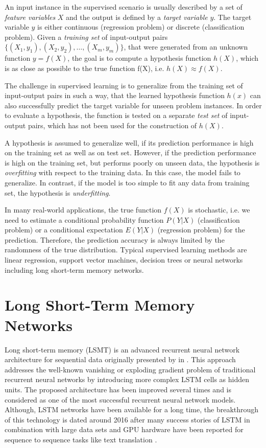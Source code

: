 An input instance in the supervised scenario is usually described by a set of \textit{feature variables} $X$ and the output is defined by a \textit{target variable} $y$.
The target variable $y$ is either continuous (regression problem) or discrete (classification problem).
Given a \textit{training set} of input-output pairs $\{(X_1, y_1), (X_2, y_2), \dots, (X_m,y_m)\}$, that were generated from an unknown function $y = f(X)$, the goal is to compute a hypothesis function $h(X)$, which is as close as possible to the true function f(X), i.e. $h(X) \approx f(X)$.

The challenge in supervised learning is to generalize from the training set of input-output pairs in such a way, that the learned hypothesis function $h(x)$ can also successfully predict the target variable for unseen problem instances.
In order to evaluate a hypothesis, the function is tested on a separate \textit{test set} of input-output pairs, which has not been used for the construction of $h(X)$.

A hypothesis is assumed to generalize well, if its prediction performance is high on the training set as well as on test set.
However, if the prediction performance is high on the training set, but performs poorly on unseen data, the hypothesis is \textit{overfitting} with respect to the training data.
In this case, the model fails to generalize.
In contrast, if the model is too simple to fit any data from training set, the hypothesis is \textit{underfitting}.

In many real-world applications, the true function $f(X)$ is stochastic, i.e. we need to estimate a conditional probability function $P(Y | X)$ (classification problem) or a conditional expectation $E(Y | X)$ (regression problem) for the prediction.
Therefore, the prediction accuracy is always limited by the randomness of the true distribution.
Typical supervised learning methods are linear regression, support vector machines, decision trees or neural networks including long short-term memory networks.
\section{Long Short-Term Memory Networks}

Long short-term memory (LSMT) is an advanced recurrent neural network architecture for sequential data originally presented by \citeauthor{DBLP:journals/neco/HochreiterS97} in \citeyear{DBLP:journals/neco/HochreiterS97} \cite{DBLP:journals/neco/HochreiterS97}.
This approach addresses the well-known vanishing or exploding gradient problem \cite{DBLP:conf/icml/PascanuMB13}  of traditional recurrent neural networks by introducing more complex LSTM cells as hidden units.
The proposed architecture has been improved several times \cite{DBLP:journals/neco/GersSC00} \cite {DBLP:journals/tnn/GreffSKSS17} and is considered as one of the most successful recurrent neural network models.
Although, LSTM networks have been available for a long time, the breakthrough of this technology is dated around 2016 after many success stories of LSTM in combination with large data sets and GPU hardware have been reported for sequence to sequence tasks like text translation \cite{DBLP:journals/corr/WuSCLNMKCGMKSJL16}.

